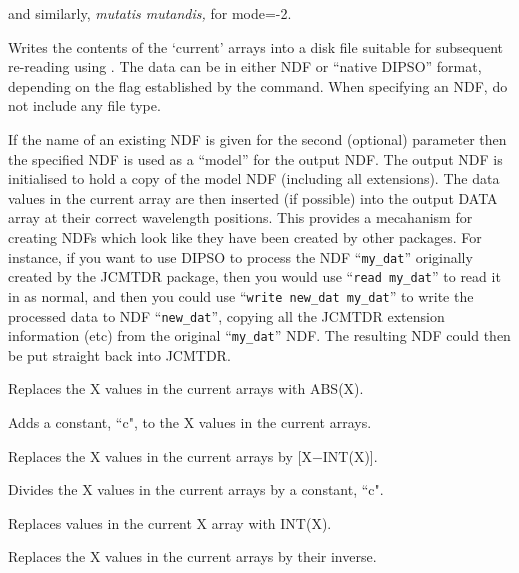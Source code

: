\begin {description}
and similarly, {\it mutatis mutandis,} for mode=-2.

Writes the contents of the `current' arrays into a disk file suitable for
subsequent re-reading using .  The data can be in either NDF or ``native
DIPSO'' format, depending on the flag established by the   command.
When specifying an NDF, do not include any file type.

If the name of an existing NDF is given for the second (optional) parameter
then the specified NDF is used as a ``model'' for the output NDF. The
output NDF is initialised to hold a copy of the model NDF (including all
extensions). The data values in the current array are then inserted (if
possible) into the output DATA array at their correct wavelength
positions. This provides a mecahanism for creating NDFs which look like
they have been created by other packages. For instance, if you want to
use DIPSO to process the NDF ``{\tt{my\_dat}}''  originally created by the
JCMTDR package, then you would use ``{\tt{read}  my\_dat}'' to read it in
as normal, and then you could use ``{\tt{write}  new\_dat my\_dat}'' to
write the processed data to NDF ``{\tt{new\_dat}}'',  copying all the
JCMTDR extension information (etc) from the original ``{\tt{my\_dat}}'' 
NDF. The resulting NDF could then be put straight back into JCMTDR.

Replaces the X values in the current arrays with ABS(X).

Adds a constant, ``c", to the X values in the current arrays.

Replaces the X values in the current arrays by [X$-$INT(X)].

Divides the X values in the current arrays by a constant, ``c".

Replaces values in the current X array with INT(X).

Replaces the X values in the current arrays by their inverse.


\end{description}
